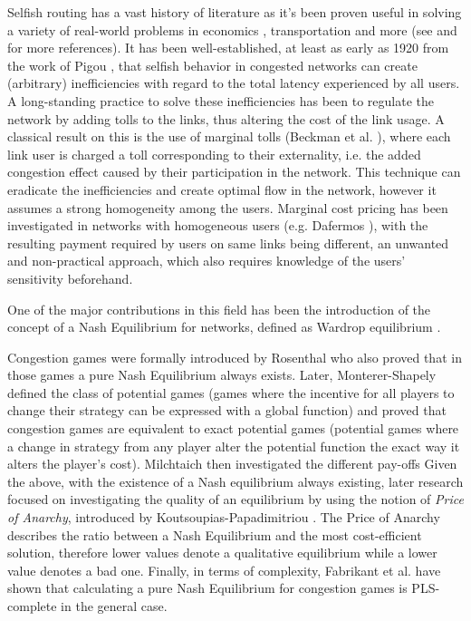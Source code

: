 \documentclass[10pt,a4paper]{book}
\theoremstyle{definition}
\theoremstyle{comment}
\begin{document}
Selfish routing has a vast history of literature as it's been proven useful in solving a variety of real-world problems in economics \cite{pigou1920economics}, transportation \cite{beckmann1956studies} and more (see \cite{roughgarden2002sr} and \cite{roughgarden2005slpoa} for more references).
It has been well-established, at least as early as 1920 from the work of Pigou \cite{pigou1920economics}, that selfish behavior in congested networks can create (arbitrary) inefficiencies with regard to the total latency experienced by all users.
A long-standing practice to solve these inefficiencies has been to regulate the network by adding tolls to the links, thus altering the cost of the link usage.
A classical result on this is the use of marginal tolls (Beckman et al. \cite{beckmann1956studies}), where each link user is charged a toll corresponding to their externality, i.e. the added congestion effect caused by their participation in the network.
This technique can eradicate the inefficiencies and create optimal flow in the network, however it assumes a strong homogeneity among the users.
Marginal cost pricing has been investigated in networks with homogeneous users (e.g. Dafermos \cite{dafermos1973toll}), with the resulting payment required by users on same links being different, an unwanted and non-practical approach, which also requires knowledge of the users' sensitivity beforehand.

One of the major contributions in this field has been the introduction of the concept of a Nash Equilibrium for networks, defined as Wardrop equilibrium \cite{wardrop_theoretical_1952}.

Congestion games were formally introduced by Rosenthal \cite{Rosenthal1973ACO} who also proved that in those games a pure Nash Equilibrium always exists.
Later, Monterer-Shapely \cite{MONDERER1996124} defined the class of potential games (games where the incentive for all players to change their strategy can be expressed with a global function) and proved that congestion games are equivalent to exact potential games (potential games where a change in strategy from any player alter the potential function the exact way it alters the player's cost).
Milchtaich \cite{MILCHTAICH1996111} then investigated the different pay-offs 
Given the above, with the existence of a Nash equilibrium always existing, later research focused on investigating the quality of an equilibrium by using the notion of \textit{Price of Anarchy}, introduced by Koutsoupias-Papadimitriou \cite{KOUTSOUPIAS200965}.
The Price of Anarchy describes the ratio between a Nash Equilibrium and the most cost-efficient solution, therefore lower values denote a qualitative equilibrium while a lower value denotes a bad one.
Finally, in terms of complexity, Fabrikant et al. \cite{10.1145/1007352.1007445} have shown that calculating a pure Nash Equilibrium for congestion games is PLS-complete in the general case.
\end{document}

